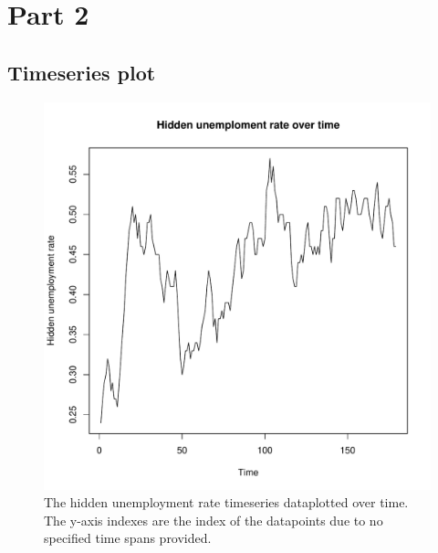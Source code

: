 \documentclass[12pt,a4paper,twoside]{article}
\begin{document}
\section{Part 2}
\subsection{Timeseries plot}
\label{sec:timeseriesplot}
\begin{figure}[!ht]
    \centering
    \includegraphics[width=\linewidth]{img/unemployment_time_series.pdf}
    \caption{The hidden unemployment rate timeseries dataplotted over time. The y-axis indexes are the index of the
    datapoints due to no specified time spans provided.}
    \label{fig:timeseriesplot}
\end{figure}
\newpage
\end{document}
